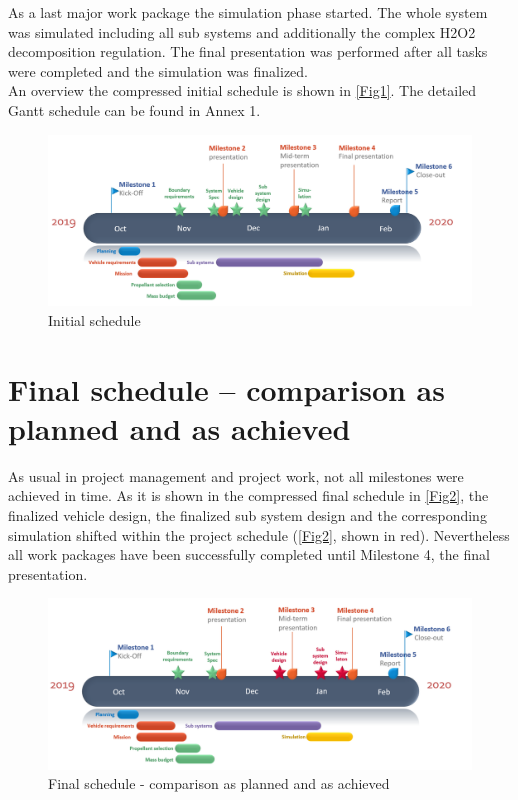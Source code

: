 As a last major work package the simulation phase started. The whole system was simulated including all sub systems and additionally the complex H2O2 decomposition regulation. The final presentation was performed after all tasks were completed and the simulation was finalized.\\

An overview the compressed initial schedule is shown in \autoref{Fig1}. The detailed Gantt schedule can be found in Annex 1.

\begin{figure}[H]
	\centering\includegraphics[width=\linewidth]{initialschedule}
	\caption{Initial schedule}\label{Fig1}
\end{figure}

\section{Final schedule – comparison as planned and as achieved}

\qquad As usual in project management and project work, not all milestones were achieved in time. As it is shown in the compressed final schedule in \autoref{Fig2}, the finalized vehicle design, the finalized sub system design and the corresponding simulation shifted within the project schedule (\autoref{Fig2}, shown in red). Nevertheless all work packages have been successfully completed until Milestone 4, the final presentation.

\begin{figure}[H]
	\centering\includegraphics[width=\linewidth]{finalschedule}
	\caption{Final schedule - comparison as planned and as achieved}\label{Fig2}
\end{figure}

